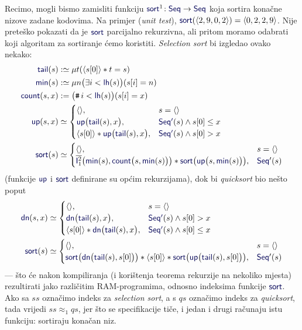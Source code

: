 \begin{primjer}[{name=[Sortiranje kao jedna funkcija s raznim implementacijama]}]
    Recimo, mogli bismo zamisliti funkciju $\f{sort}^1\!:\f{Seq}\to\f{Seq}$ koja sortira konačne nizove zadane kodovima. Na primjer (\emph{unit test}), $\f{sort}(\kr{2,9,0,2})=\kr{0,2,2,9}$. Nije preteško pokazati da je $\f{sort}$ parcijalno rekurzivna, ali pritom moramo odabrati koji algoritam za sortiranje ćemo koristiti. \emph{Selection sort} bi izgledao ovako nekako:
\begin{align}
    \f{tail}(s)&:\simeq\mu t(\kr{s[0]}*t=s)\\
    \f{min}(s)&:\simeq\mu n\bigl(\exists i<\f{lh}(s)\bigr)(s[i]=n)\\
    \f{count}(s,x)&:=\bigl(\num i<\f{lh}(s)\bigr)(s[i]=x)\\
    \f{up}(s,x)&\simeq\begin{cases}
        \kr{},&s=\kr{}\\
        \f{up}\bigl(\f{tail}(s),x\bigr),&\f{Seq'}(s)\land s[0]\le x\\
        \kr{s[0]}*\f{up}\bigl(\f{tail}(s),x\bigr),&\f{Seq'}(s)\land s[0]>x
    \end{cases}\\
    \f{sort}(s)&\simeq\begin{cases}
        \kr{},&s=\kr{}\\
        \overline{\f I_1^2}\bigl(\f{min}(s),\f{count}\bigl(s,\f{min}(s)\bigr)\bigr)*\f{sort}\bigl(\f{up}\bigl(s,\f{min}(s)\bigr)\bigr),&\f{Seq}'(s)
    \end{cases}
\end{align}
(funkcije $\f{up}$ i $\f{sort}$ definirane su općim rekurzijama), dok bi \emph{quicksort} bio nešto poput
\begin{align}
    \f{dn}(s,x)&\simeq\begin{cases}
        \kr{},&s=\kr{}\\
        \f{dn}\bigl(\f{tail}(s),x\bigr),&\f{Seq'}(s)\land s[0]>x\\
        \kr{s[0]}*\f{dn}\bigl(\f{tail}(s),x\bigr),&\f{Seq'}(s)\land s[0]\le x
    \end{cases}\\
    \f{sort}(s)&\simeq\begin{cases}
        \kr{},&s=\kr{}\\
        \f{sort}\bigl(\f{dn}\bigl(\f{tail}(s),s[0]\bigr)\bigr)*\kr{s[0]}*\f{sort}\bigl(\f{up}\bigl(\f{tail}(s),s[0]\bigr)\bigr),&\f{Seq}'(s)
    \end{cases}
\end{align}
--- što će nakon kompiliranja (i korištenja teorema rekurzije na nekoliko mjesta) rezultirati jako različitim RAM-programima, odnosno indeksima funkcije $\f{sort}$. Ako sa $ss$ označimo indeks za \emph{selection sort}, a s $qs$ označimo indeks za \emph{quicksort}, tada vrijedi $ss\approx_1qs$, jer što se specifikacije tiče, i jedan i drugi računaju istu funkciju: sortiraju konačan niz.


\end{primjer}
